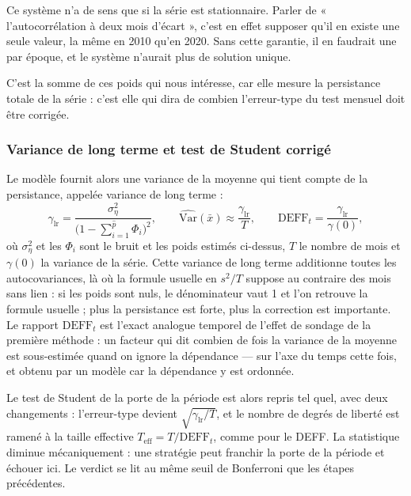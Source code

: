 Ce système n'a de sens que si la série est stationnaire. Parler de
« l'autocorrélation à deux mois d'écart », c'est en effet supposer qu'il en
existe une seule valeur, la même en 2010 qu'en 2020. Sans cette garantie, il
en faudrait une par époque, et le système n'aurait plus de solution unique.

C'est la somme de ces poids qui nous intéresse, car elle mesure la persistance
totale de la série : c'est elle qui dira de combien l'erreur-type du test
mensuel doit être corrigée.

\subsubsection*{Variance de long terme et test de Student corrigé}

Le modèle fournit alors une variance de la moyenne qui tient compte de la
persistance, appelée variance de long terme :
\[
  \gamma_{\mathrm{lr}}
     = \frac{\sigma^2_\eta}{\bigl(1-\sum_{i=1}^{\hat p}\Phi_i\bigr)^{2}},
  \qquad
  \widehat{\mathrm{Var}}(\bar x) \approx \frac{\gamma_{\mathrm{lr}}}{T},
  \qquad
  \mathrm{DEFF}_t = \frac{\gamma_{\mathrm{lr}}}{\gamma(0)},
\]
où \(\sigma^2_\eta\) et les \(\Phi_i\) sont le bruit et les poids estimés
ci-dessus, \(T\) le nombre de mois et \(\gamma(0)\) la variance de la série.
Cette variance de long
terme additionne toutes les autocovariances, là où la formule usuelle en
\(s^2/T\) suppose au contraire des mois sans lien : si les poids sont nuls,
le dénominateur vaut 1 et l'on retrouve la formule usuelle ; plus la
persistance est forte, plus la correction est importante. Le rapport
\(\mathrm{DEFF}_t\) est l'exact analogue temporel de l'effet de sondage de la
première méthode : un facteur qui dit combien de fois la variance de la
moyenne est sous-estimée quand on ignore la dépendance — sur l'axe du temps
cette fois, et obtenu par un modèle car la dépendance y est ordonnée.

Le test de Student de la porte de la période est alors repris tel quel, avec
deux changements : l'erreur-type devient
\(\sqrt{\gamma_{\mathrm{lr}}/T}\), et le nombre de degrés de liberté est
ramené à la taille effective \(T_{\mathrm{eff}} = T/\mathrm{DEFF}_t\), comme
pour le DEFF. La statistique diminue mécaniquement : une stratégie peut
franchir la porte de la période et échouer ici. Le verdict se lit au même
seuil de Bonferroni que les étapes précédentes.

